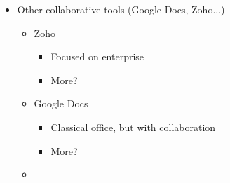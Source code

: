 \begin{itemize}
  \item Other collaborative tools (Google Docs, Zoho...)
  \begin{itemize}
    \item Zoho
    \begin{itemize}
      \item Focused on enterprise
      \item More?
    \end{itemize}
    \item Google Docs
    \begin{itemize}
      \item Classical office, but with collaboration
      \item More?
    \end{itemize}
  \item {} 
  \end{itemize}
  
\end{itemize}
